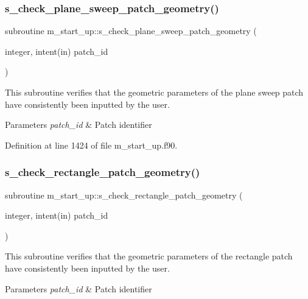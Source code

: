 \subsubsection{\texorpdfstring{s\+\_\+check\+\_\+plane\+\_\+sweep\+\_\+patch\+\_\+geometry()}{s\_check\_plane\_sweep\_patch\_geometry()}}
{\footnotesize\ttfamily subroutine m\+\_\+start\+\_\+up\+::s\+\_\+check\+\_\+plane\+\_\+sweep\+\_\+patch\+\_\+geometry (\begin{DoxyParamCaption}\item[{integer, intent(in)}]{patch\+\_\+id }\end{DoxyParamCaption})}



This subroutine verifies that the geometric parameters of the plane sweep patch have consistently been inputted by the user. 


\begin{DoxyParams}{Parameters}
{\em patch\+\_\+id} & Patch identifier \\
\hline
\end{DoxyParams}


Definition at line 1424 of file m\+\_\+start\+\_\+up.\+f90.

\mbox{\label{namespacem__start__up_a038565f6f0f4ed12a0a3738ab880f507}} 
\subsubsection{\texorpdfstring{s\+\_\+check\+\_\+rectangle\+\_\+patch\+\_\+geometry()}{s\_check\_rectangle\_patch\_geometry()}}
{\footnotesize\ttfamily subroutine m\+\_\+start\+\_\+up\+::s\+\_\+check\+\_\+rectangle\+\_\+patch\+\_\+geometry (\begin{DoxyParamCaption}\item[{integer, intent(in)}]{patch\+\_\+id }\end{DoxyParamCaption})}



This subroutine verifies that the geometric parameters of the rectangle patch have consistently been inputted by the user. 


\begin{DoxyParams}{Parameters}
{\em patch\+\_\+id} & Patch identifier \\
\hline
\end{DoxyParams}


